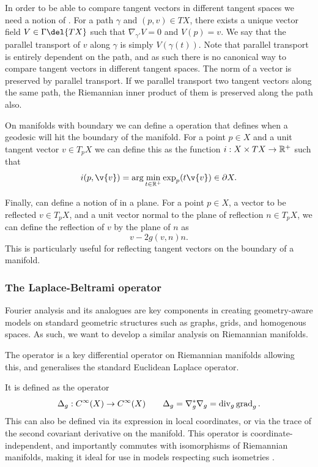 In order to be able to compare tangent vectors in different tangent spaces we need a notion of .
For a path \(\gamma\) and \((p, v) \in TX\), there exists a unique vector field \(V \in \Gamma\del{TX}\) such that \(\nabla_{\gamma'}V = 0\) and \(V(p) = v\).
We say that the parallel transport of \(v\) along \(\gamma\) is simply \(V(\gamma(t))\).
Note that parallel transport is entirely dependent on the path, and as such there is no canonical way to compare tangent vectors in different tangent spaces.
The norm of a vector is preserved by parallel transport.
If we parallel transport two tangent vectors along the same path, the Riemannian inner product of them is preserved along the path also.

On manifolds with boundary we can define a  operation that defines when a geodesic will hit the boundary of the manifold.
For a point \(p\in X\) and a unit tangent vector \(v\in T_pX\) we can define this as the function \(i: X\times TX \to \mathbb{R}^+\) such that 
\[
	i(p, \v{v}) = \arg\min_{t\in\R^+} \exp_p(t\v{v}) \in \partial X.
\]

Finally, can define a notion of  in a plane.
For a point \(p\in X\), a vector to be reflected \(v\in T_pX\), and a unit vector normal to the plane of reflection \(n\in T_pX\), we can define the reflection of \(v\) by the plane of \(n\) as
\[v - 2 g(v, n) n.\]
This is particularly useful for reflecting tangent vectors on the boundary of a manifold.

\subsubsection{The Laplace-Beltrami operator}

Fourier analysis and its analogues are key components in creating geometry-aware models on standard geometric structures such as graphs, grids, and homogenous spaces.
As such, we want to develop a similar analysis on Riemannian manifolds.

The  operator is a key differential operator on Riemannian manifolds allowing this, and generalises the standard Euclidean Laplace operator.

It is defined as the operator
\[\Delta_g: C^\infty(X)\to C^\infty(X) \quad\quad\Delta_g = \nabla^*_g \nabla_g = \operatorname{div}_g \operatorname{grad}_g.\]
This can also be defined via its expression in local coordinates, or via the trace of the second covariant derivative on the manifold.
This operator is coordinate-independent, and importantly commutes with isomorphisms of Riemannian manifolds, making it ideal for use in models respecting such isometries \cite[p. 46]{canzani2013analysis}.

